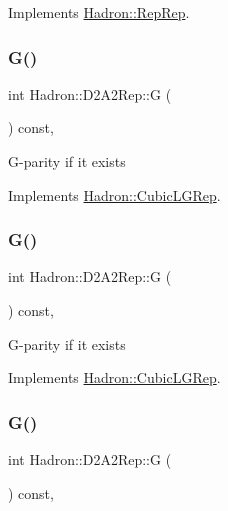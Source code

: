 Implements \mbox{\hyperlink{structHadron_1_1RepRep_a92c8802e5ed7afd7da43ccfd5b7cd92b}{Hadron\+::\+Rep\+Rep}}.

\mbox{\label{structHadron_1_1D2A2Rep_ad6b91beef1bc07a45a48d12192595cae}} 
\subsubsection{\texorpdfstring{G()}{G()}\hspace{0.1cm}{\footnotesize\ttfamily [1/3]}}
{\footnotesize\ttfamily int Hadron\+::\+D2\+A2\+Rep\+::G (\begin{DoxyParamCaption}{ }\end{DoxyParamCaption}) const\hspace{0.3cm}{\ttfamily [inline]}, {\ttfamily [virtual]}}

G-\/parity if it exists 

Implements \mbox{\hyperlink{structHadron_1_1CubicLGRep_ace26f7b2d55e3a668a14cb9026da5231}{Hadron\+::\+Cubic\+L\+G\+Rep}}.

\mbox{\label{structHadron_1_1D2A2Rep_ad6b91beef1bc07a45a48d12192595cae}} 
\subsubsection{\texorpdfstring{G()}{G()}\hspace{0.1cm}{\footnotesize\ttfamily [2/3]}}
{\footnotesize\ttfamily int Hadron\+::\+D2\+A2\+Rep\+::G (\begin{DoxyParamCaption}{ }\end{DoxyParamCaption}) const\hspace{0.3cm}{\ttfamily [inline]}, {\ttfamily [virtual]}}

G-\/parity if it exists 

Implements \mbox{\hyperlink{structHadron_1_1CubicLGRep_ace26f7b2d55e3a668a14cb9026da5231}{Hadron\+::\+Cubic\+L\+G\+Rep}}.

\mbox{\label{structHadron_1_1D2A2Rep_ad6b91beef1bc07a45a48d12192595cae}} 
\subsubsection{\texorpdfstring{G()}{G()}\hspace{0.1cm}{\footnotesize\ttfamily [3/3]}}
{\footnotesize\ttfamily int Hadron\+::\+D2\+A2\+Rep\+::G (\begin{DoxyParamCaption}{ }\end{DoxyParamCaption}) const\hspace{0.3cm}{\ttfamily [inline]}, {\ttfamily [virtual]}}


